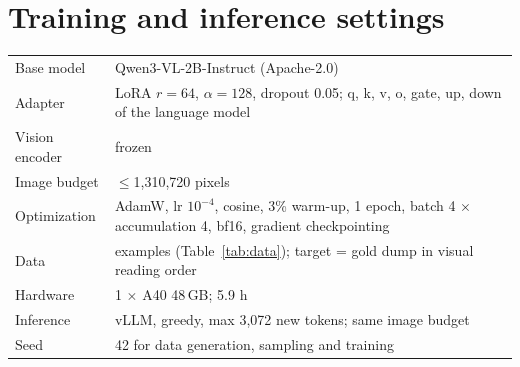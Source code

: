 \documentclass[10pt,twocolumn]{article}
\begin{document}
\section{Training and inference settings}
\begin{table}[h]
\centering\small
\begin{tabular}{ll}
\toprule
Base model & Qwen3-VL-2B-Instruct (Apache-2.0) \\
Adapter & LoRA $r=64$, $\alpha=128$, dropout 0.05; q, k, v, o, gate, up, down of the language model \\
Vision encoder & frozen \\
Image budget & $\le$1{,}310{,}720 pixels \\
Optimization & AdamW, lr $10^{-4}$, cosine, 3\% warm-up, 1 epoch, batch 4 $\times$ accumulation 4, bf16, gradient checkpointing \\
Data & \Nntrainused{} examples (Table~\ref{tab:data}); target = gold dump in visual reading order \\
Hardware & 1 $\times$ A40 48\,GB; 5.9 h \\
Inference & vLLM, greedy, max 3{,}072 new tokens; same image budget \\
Seed & 42 for data generation, sampling and training \\
\bottomrule
\end{tabular}
\end{table}
\end{document}
